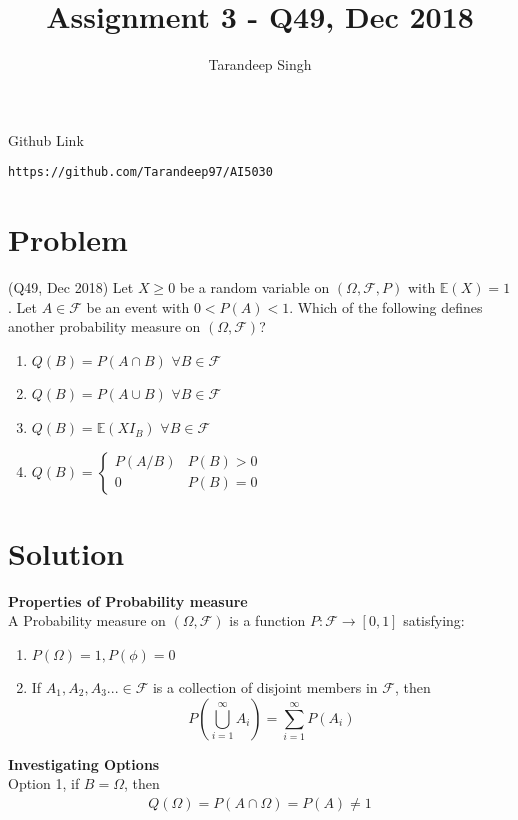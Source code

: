 \documentclass[journal,12pt,twocolumn]{IEEEtran}
\begin{document}
     \def\rightbox#1{\makebox[0in][r]{#1}}
     \def\centbox#1{\makebox[0in]{#1}}
     \def\topbox#1{\raisebox{-\baselineskip}[0in][0in]{#1}}
     \def\midbox#1{\raisebox{-0.5\baselineskip}[0in][0in]{#1}}
\vspace{3cm}
\title{Assignment 3 - Q49, Dec 2018}
\author{Tarandeep Singh}
\maketitle
\newpage
\bigskip
\renewcommand{\thefigure}{\theenumi}
\renewcommand{\thetable}{\theenumi}
Github Link
\begin{lstlisting}
https://github.com/Tarandeep97/AI5030
\end{lstlisting}
\section{Problem}
(Q49, Dec 2018) Let $X \geq 0$ be a random variable on  $(\Omega,{\mathcal {F}}, P)$ with $\mathbb{E}(X)=1$. Let $A\in{\mathcal {F}}$ be an event with $ 0 < P(A) < 1$. Which of the following defines another probability measure on $(\Omega,{\mathcal {F}})$?
\begin{enumerate}
\item $Q(B) = P(A\cap B)$     $\forall B \in {\mathcal {F}}$
\item $Q(B) = P(A\cup B)$     $\forall B \in {\mathcal {F}}$
\item $Q(B) = \mathbb{E}(XI_{B})$     $\forall B \in {\mathcal {F}}$ 
\item $Q(B) = \begin{cases} 
      P(A/B) & P(B)> 0 \\
      0 & P(B) = 0 
   \end{cases}$

\end{enumerate}

\section{Solution}
\textbf{Properties of Probability measure} \\
A Probability measure on $(\Omega,{\mathcal {F}})$ is a function $P:{\mathcal {F}} \rightarrow [0,1]$ satisfying:
\begin{enumerate}
\item $P(\Omega)=1, P(\phi)=0$
\item If $A_{1},A_{2},A_{3}... \in {\mathcal {F}}$  is a collection of disjoint members in ${\mathcal {F}}$, then  \\
 \[P\left(\bigcup_{i=1}^{\infty} A_{i}\right)= \sum_{i=1}^{\infty} P(A_{i}) \]  
\end{enumerate}
\textbf{Investigating Options}\\
Option 1, if $B= \Omega$, then
\begin{align}
    Q(\Omega) = P(A \cap \Omega) = P(A) \neq 1
\end{align}
\end{document}
